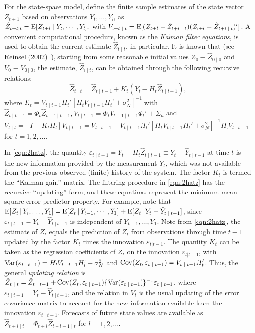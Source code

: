 For the state-space model, define the finite sample estimates of the state vector $Z_{t+1}$ based on observations $Y_t, \ldots, Y_l$, as $\hat{Z}_{t+l|t} = \operatorname{E}[Z_{t+l} \;|\; Y_t,\cdots,Y_l],\text{ with } V_{t+l \;|\; t} = \operatorname{E}[(Z_{t+l} - \hat{Z}_{t+l \;|\; t})(Z_{t+l} - \hat{Z}_{t+l \;|\; t})']$. A convenient computational procedure, known as the \emph{Kalman filter equations},\label{in:kalman} is used to obtain the current estimate $\hat{Z}_{t\;|\;t}$, in particular. It is known that (see Reinsel (2002)~\cite{2002reinsel}), starting from some reasonable initial values $Z_0 \equiv \hat{Z}_{0 \;|\; 0}$ and $V_0 \equiv V_{0\;|\;0}$, the estimate, $\hat{Z}_{t \;|\; t}$, can be obtained through the following recursive relations:
	\begin{equation}\label{eqn:2hatz}
	\hat{Z}_{t \;|\; t} = \hat{Z}_{t \;|\; t-1} + K_t(Y_t - H_t \hat{Z}_{t \;|\; t-1}),
	\end{equation}
where $K_t= V_{t \;|\; t-1} H_t'[H_t V_{t \;|\; t-1} H_t' + \sigma_N^2]^{-1}$ with $\hat{Z}_{t \;|\; t-1} = \Phi_t \hat{Z}_{t-1\;|\; t-1},V_{t \;|\; t-1} = \Phi_t V_{t-1\;|\; t-1} \Phi_t' + \Sigma_{a}$ and $V_{t \;|\; t} = [I - K_t H_t] V_{t \;|\; t-1} = V_{t\;|\; t-1} - V_{t\;|\; t-1} H_t' [H_t V_{t \;|\; t-1} H_t' + \sigma_N^2]^{-1} H_t V_{t \;|\; t-1}$ for $t= 1,2, \ldots$.


In \eqref{eqn:2hatz}, the quantity $\varepsilon_{t \;|\; t-1}= Y_t - H_t \hat{Z}_{t \;|\; t-1} \equiv Y_t - \hat{Y}_{t \;|\; t-1}$ at time $t$ is the new information provided by the measurement $Y_t$, which was not available from the previous observed (finite) history of the system. The factor $K_t$ is termed the ``Kalman gain'' matrix. The filtering procedure in \eqref{eqn:2hatz} has the recursive ``updating'' form, and these equations represent the minimum mean square error predictor property. For example, note that $\operatorname{E}[Z_t \,|\,Y_t,\ldots,Y_1]= \operatorname{E}[Z_t \,|\,Y_{t-1},\cdots,Y_1] + \operatorname{E}[Z_t \,|\, Y_t - \hat{Y}_{t \;|\; t-1}]$, since $\varepsilon_{t \;|\; t-1} = Y_t - \hat{Y}_{t \;|\; t-1}$ is independent of $Y_{t-1}, \ldots, Y_1$. Note from \eqref{eqn:2hatz}, the estimate of $Z_t$ equals the prediction of $Z_t$ from observations through time $t-1$ updated by the factor $K_t$ times the innovation $\varepsilon_{t|t-1}$. The quantity $K_t$ can be taken as the regression coefficients of $Z_t$ on the innovation $\varepsilon_{t|t-1}$, with $\operatorname{Var}(\varepsilon_{t\;|\; t-1}) = H_t V_{t\;|\; t-1} H_t' + \sigma_N^2$ and $\operatorname{Cov}(Z_t,\varepsilon_{t\;|\; t-1})= V_{t \;|\; t-1} H_t'$. Thus, the general \emph{updating relation} is $\hat{Z}_{t\;|\;t} = \hat{Z}_{t\;|\; t-1} + \operatorname{Cov}(Z_t,\varepsilon_{t\;|\; t-1}) \{ \operatorname{Var}(\varepsilon_{t\;|\; t-1}) \}^{-1} \varepsilon_{t\;|\; t-1}$, where $\varepsilon_{t \;|\; t-1} = Y_t - \hat{Y}_{t\;|\; t-1}$, and the relation in $V_t$ is the usual updating of the error covariance matrix to account for the new information available from the innovation $\varepsilon_{t\;|\; t-1}$. Forecasts of future state values are available as $\hat{Z}_{t+l\;|\;t} = \Phi_{t+l} \hat{Z}_{t+l-1\;|\;t}$ for $l = 1,2,\ldots$. 


